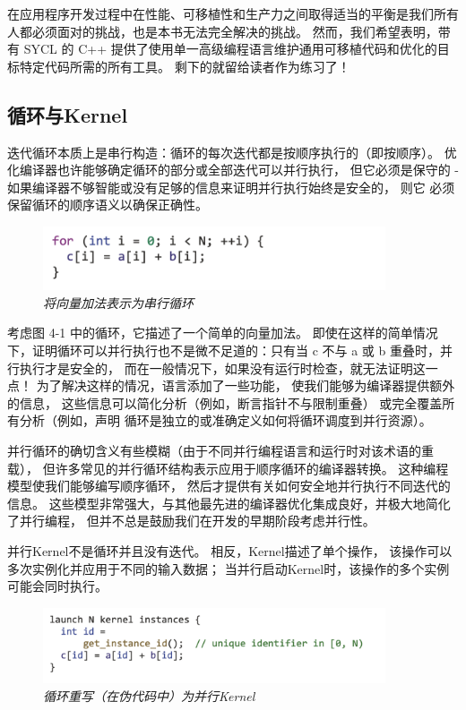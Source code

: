 在应用程序开发过程中在性能、可移植性和生产力之间取得适当的平衡是我们所有人都必须面对的挑战，也是本书无法完全解决的挑战。 
然而，我们希望表明，带有 SYCL 的 C++ 提供了使用单一高级编程语言维护通用可移植代码和优化的目标特定代码所需的所有工具。 
剩下的就留给读者作为练习了！

\subsection{循环与Kernel}
迭代循环本质上是串行构造：循环的每次迭代都是按顺序执行的（即按顺序）。 
优化编译器也许能够确定循环的部分或全部迭代可以并行执行，
但它必须是保守的 - 如果编译器不够智能或没有足够的信息来证明并行执行始终是安全的，
则它 必须保留循环的顺序语义以确保正确性。

\begin{figure}[H]
	\centering
	\includegraphics[width=0.9\textwidth]{figs/F4.1.png}
	\caption{\textit{将向量加法表示为串行循环}}
\end{figure}

考虑图 4-1 中的循环，它描述了一个简单的向量加法。 
即使在这样的简单情况下，证明循环可以并行执行也不是微不足道的：只有当 c 不与 a 或 b 重叠时，并行执行才是安全的，
而在一般情况下，如果没有运行时检查，就无法证明这一点！ 为了解决这样的情况，语言添加了一些功能，
使我们能够为编译器提供额外的信息，
这些信息可以简化分析（例如，断言指针不与限制重叠）
或完全覆盖所有分析（例如，声明 循环是独立的或准确定义如何将循环调度到并行资源）。

并行循环的确切含义有些模糊（由于不同并行编程语言和运行时对该术语的重载），
但许多常见的并行循环结构表示应用于顺序循环的编译器转换。 这种编程模型使我们能够编写顺序循环，
然后才提供有关如何安全地并行执行不同迭代的信息。 
这些模型非常强大，与其他最先进的编译器优化集成良好，并极大地简化了并行编程，
但并不总是鼓励我们在开发的早期阶段考虑并行性。

并行Kernel不是循环并且没有迭代。 相反，Kernel描述了单个操作，
该操作可以多次实例化并应用于不同的输入数据； 当并行启动Kernel时，该操作的多个实例可能会同时执行。

\begin{figure}[H]
	\centering
	\includegraphics[width=0.9\textwidth]{figs/F4.2.png}
	\caption{\textit{循环重写（在伪代码中）为并行Kernel}}
\end{figure}

